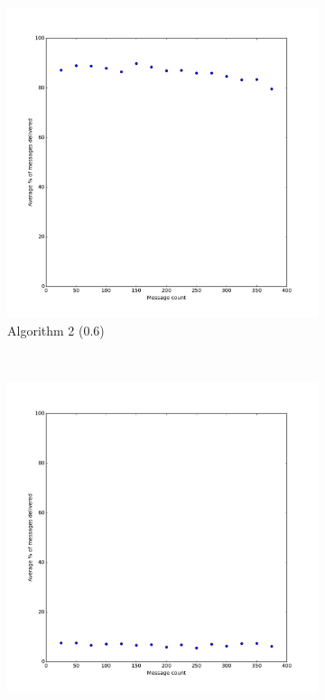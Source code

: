 \documentclass[bsc,frontabs,twoside,singlespacing,parskip,deptreport]{infthesis}     %
\begin{document}
\begin{figure}
    
    \begin{subfigure}[b]{0.3\textwidth}
        \includegraphics[width=\textwidth]{results/Prob50Share_Prob60}
        \caption{Algorithm 2 (0.6)}
        \label{fig:results/Prob50Share_Prob60}
    \end{subfigure}
    ~ %
    \begin{subfigure}[b]{0.3\textwidth}
        \includegraphics[width=\textwidth]{results/Prob50Share_OnlyBest}

\end{subfigure}
\end{figure}
\end{document}
